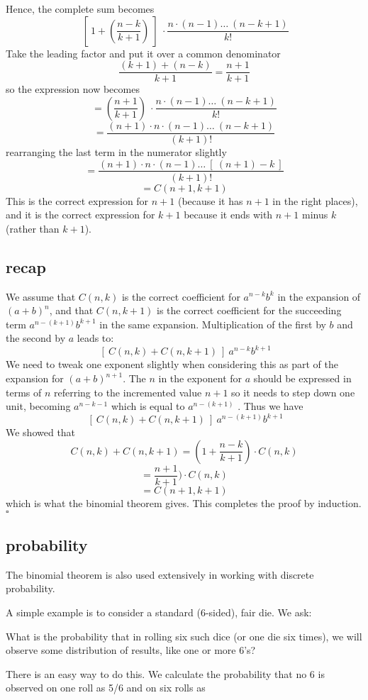 \documentclass[11pt, oneside]{article}
\begin{document}
Hence, the complete sum becomes
\[ \ [ \ 1 + (\frac{n-k}{k+1})  \ ] \  \cdot \frac{n \cdot (n-1) \dots \ (n-k+1) }{k!}  \]
Take the leading factor and put it over a common denominator
\[ \frac{(k+1) + (n-k)}{k+1} = \frac{n+1}{k+1} \]
so the expression now becomes
\[ = ( \frac{n+1}{k+1} ) \  \cdot \frac{n \cdot (n-1) \dots \ (n-k+1) }{k!}  \]
\[ = \frac{(n+1) \cdot n \cdot (n-1) \dots \ (n-k+1) }{(k+1)!}  \]
rearranging the last term in the numerator slightly
\[ = \frac{(n+1) \cdot n \cdot (n-1) \dots \ [ \ (n+1)-k \ ] }{(k+1)!}  \]
\[ = C(n+1,k+1) \]
This is the correct expression for $n+1$ (because it has $n+1$ in the right places), and it is the correct expression for $k+1$ because it ends with $n+1$ minus $k$ (rather than $k+1$).  

\subsection*{recap}
We assume that $C(n,k)$ is the correct coefficient for $a^{n-k}b^k$ in the expansion of $(a+b)^n$, and that $C(n,k+1)$ is the correct coefficient for the succeeding term $a^{n-(k+1)}b^{k+1}$ in the same expansion.  Multiplication of the first by $b$ and the second by $a$ leads to:
\[ \ [ \ C(n,k) + C(n,k+1) \ ] \ a^{n-k}b^{k+1} \]
We need to tweak one exponent slightly when considering this as part of the  expansion for $(a+b)^{n+1}$.  The $n$ in the exponent for $a$ should be expressed in terms of $n$ referring to the incremented value $n+1$ so it needs to step down one unit, becoming $a^{n-k - 1}$ which is equal to $a^{n-(k+1)}$ .  Thus we have
\[ \ [ \ C(n,k) + C(n,k+1) \ ] \ a^{n-(k+1)}b^{k+1} \]
We showed that 
\[ C(n,k) + C(n,k+1) = (1 + \frac{n-k}{k+1}) \cdot  C(n,k) \]
\[ = \frac{n+1}{k+1}) \cdot  C(n,k) \]
\[ = C(n+1,k+1) \]
which is what the binomial theorem gives.  This completes the proof by induction.
$\square$

\subsection*{probability}
The binomial theorem is also used extensively in working with discrete probability.  

A simple example is to consider a standard (6-sided), fair die.  We ask: 

What is the probability that in rolling six such dice (or one die six times), we will observe some distribution of results, like one or more 6's?

There is an easy way to do this.  We calculate the probability that no 6 is observed on one roll as 5/6 and on six rolls as
\end{document}
